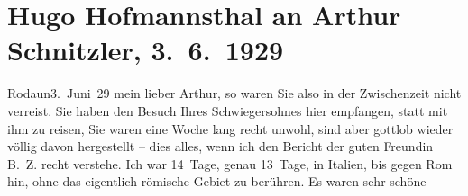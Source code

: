 

         
         \renewcommand{\erwaehntePersonen}{Personen: Arnoldo Cappellini, Hugo von Hofmannsthal, Berta Zuckerkandl}
         \renewcommand{\erwaehnteOrte}{Orte: Italien, Rodaun, Rom, Wien}
         \renewcommand{\erwaehnteWerke}{Werke: Der Weg ins Freie. Roman, Der einsame Weg. Schauspiel in fünf Akten, Dämmerseelen. Novellen, Fräulein Else, Lieutenant Gustl. Novelle}
               \section[Hugo Hofmannsthal an Arthur Schnitzler, 3. 6. 1929]{ Hugo Hofmannsthal an Arthur Schnitzler, 3. 6. 1929}\nopagebreak{}\rehead{ }\begin{ledgroupsized}[t]{13cm}\normalsize\beginnumbering \toendnotes[C]{\smallbreak\pagebreak[2]} 
\toendnotes[C]{\smallbreak}\pstart
           {\pb}Rodaun3. Juni 29\pend
           \pstart{}mein lieber Arthur, \pend\pstart
           so waren Sie also in der Zwischenzeit nicht verreist. Sie haben den Besuch Ihres Schwiegersohnes hier
               empfangen, statt mit ihm zu reisen,  Sie waren
               eine Woche lang recht unwohl, sind aber gottlob wieder völlig davon hergestellt –
               dies alles, wenn ich den Bericht der guten Freundin B. Z. recht verstehe.\pend
           \pstart
           Ich war 14 Tage, genau 13 Tage, in Italien, bis
               gegen Rom hin, ohne das eigentlich römische Gebiet zu berühren. Es waren sehr schöne

\end{ledgroupsized}
